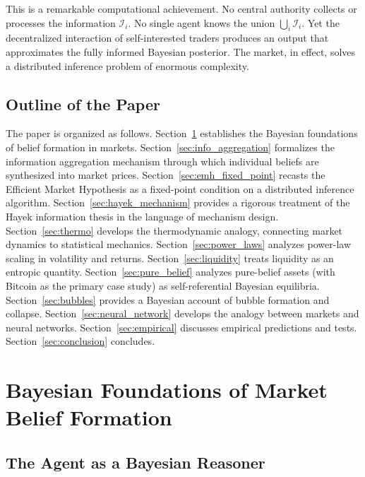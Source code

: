 \documentclass[12pt,a4paper]{article}
\theoremstyle{definition}
\newcommand{\I}{\mathcal{I}}
\begin{document}
This is a remarkable computational achievement. No central authority collects or processes the information $\I_i$. No single agent knows the union $\bigcup_i \I_i$. Yet the decentralized interaction of self-interested traders produces an output that approximates the fully informed Bayesian posterior. The market, in effect, solves a distributed inference problem of enormous complexity.

\subsection{Outline of the Paper}

The paper is organized as follows. Section~\ref{sec:bayesian_foundations} establishes the Bayesian foundations of belief formation in markets. Section~\ref{sec:info_aggregation} formalizes the information aggregation mechanism through which individual beliefs are synthesized into market prices. Section~\ref{sec:emh_fixed_point} recasts the Efficient Market Hypothesis as a fixed-point condition on a distributed inference algorithm. Section~\ref{sec:hayek_mechanism} provides a rigorous treatment of the Hayek information thesis in the language of mechanism design. Section~\ref{sec:thermo} develops the thermodynamic analogy, connecting market dynamics to statistical mechanics. Section~\ref{sec:power_laws} analyzes power-law scaling in volatility and returns. Section~\ref{sec:liquidity} treats liquidity as an entropic quantity. Section~\ref{sec:pure_belief} analyzes pure-belief assets (with Bitcoin as the primary case study) as self-referential Bayesian equilibria. Section~\ref{sec:bubbles} provides a Bayesian account of bubble formation and collapse. Section~\ref{sec:neural_network} develops the analogy between markets and neural networks. Section~\ref{sec:empirical} discusses empirical predictions and tests. Section~\ref{sec:conclusion} concludes.



\section{Bayesian Foundations of Market Belief Formation}\label{sec:bayesian_foundations}

\subsection{The Agent as a Bayesian Reasoner}
\end{document}
